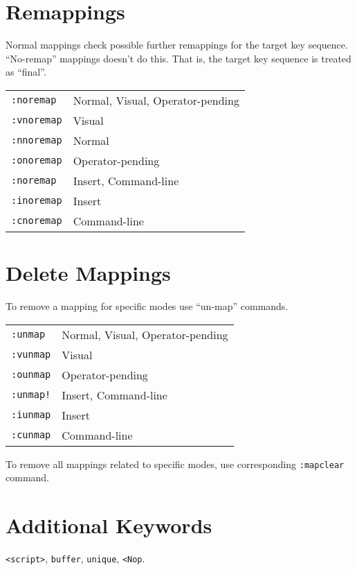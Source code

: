 \section{Remappings}
Normal mappings check possible further remappings for the target key sequence.
``No-remap'' mappings doesn't do this. That is, the target key sequence is treated as ``final''.
\begin{table}
  \centering
  \begin{tabular}{ll}
    \verb|:noremap|&Normal, Visual, Operator-pending\\
    \verb|:vnoremap|&Visual\\
    \verb|:nnoremap|&Normal\\
    \verb|:onoremap|&Operator-pending\\
    \verb|:noremap|&Insert, Command-line\\
    \verb|:inoremap|&Insert\\
    \verb|:cnoremap|&Command-line
  \end{tabular}
\end{table}
\section{Delete Mappings}
To remove a mapping for specific modes use ``un-map'' commands.
\begin{table}
  \centering
  \begin{tabular}{ll}
    \verb|:unmap|&Normal, Visual, Operator-pending\\
    \verb|:vunmap|&Visual\\
    \verb|:ounmap|&Operator-pending\\
    \verb|:unmap!|&Insert, Command-line\\
    \verb|:iunmap|&Insert\\
    \verb|:cunmap|&Command-line
  \end{tabular}
\end{table}

To remove all mappings related to specific modes, use corresponding \verb|:mapclear| command.
\section{Additional Keywords}
\verb|<script>|, \verb|buffer|, \verb|unique|, \verb|<Nop|.
